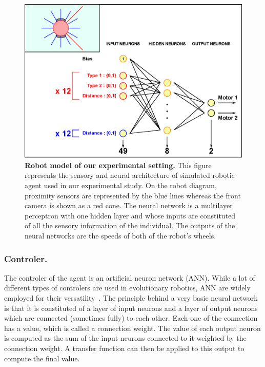     \begin{figure}[hbtp]
        \begin{center}
          \includegraphics[scale = 0.30]{fig/Intro/RobotModel.eps}
          \caption{\textbf{Robot model of our experimental setting.}
          This figure represents the sensory and neural architecture of simulated robotic agent used in our experimental study. On the robot diagram, proximity sensors are represented by the blue lines whereas the front camera is shown as a red cone. The neural network is a multilayer perceptron with one hidden layer and whose inputs are constituted of all the sensory information of the individual. The outputs of the neural networks are the speeds of both of the robot's wheels.} 
          \label{fig:RobotModel}
        \end{center}
    \end{figure}

    \subsubsection{Controler.} The controler of the agent is an artificial neuron network (ANN). While a lot of different types of controlers are used in evolutionary robotics, ANN are widely employed for their versatility~\parencite{Doncieux2015}. The principle behind a very basic neural network is that it is constituted of a layer of input neurons and a layer of output neurons which are connected (sometimes fully) to each other. Each one of the connection has a value, which is called a connection weight. The value of each output neuron is computed as the sum of the input neurons connected to it weighted by the connection weight. A transfer function can then be applied to this output to compute the final value. 


